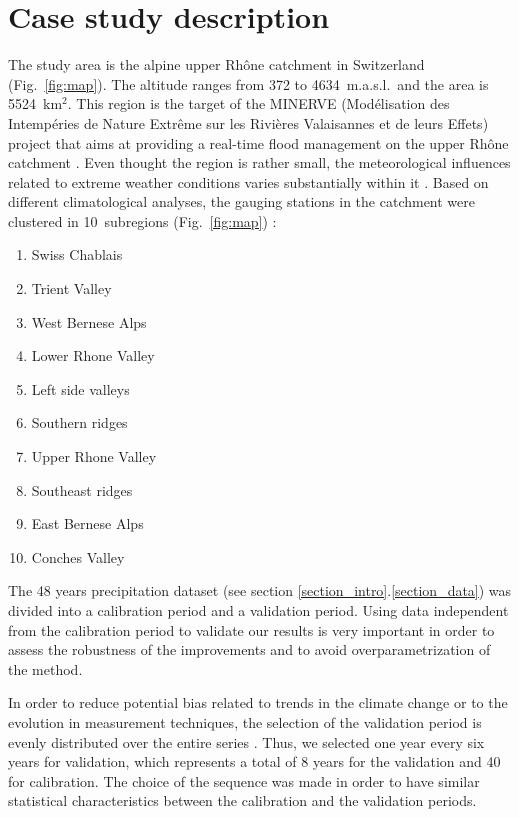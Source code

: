 \documentclass[twocol]{ametsoc}
\begin{document}
\section{Case study description}

The study area is the alpine upper Rh\^{o}ne catchment in Switzerland (Fig.\ \ref{fig:map}). The altitude ranges from 372 to 4634~m.a.s.l.\ and the area is 5524~km$^{2}$. This region is the target of the MINERVE (Mod\'{e}lisation des Intemp\'{e}ries de Nature Extr\^{e}me sur les Rivi\`{e}res Valaisannes et de leurs Effets) project that aims at providing a real-time flood management on the upper Rh\^{o}ne catchment \citep{GarciaHernandez2009b}. Even thought the region is rather small, the meteorological influences related to extreme weather conditions varies substantially within it \citep[see][]{Horton2012}. Based on different climatological analyses, the gauging stations in the catchment were clustered in 10~subregions (Fig.\ \ref{fig:map}) :

\begin{enumerate}
	\setlength\itemsep{-4px}
	\item Swiss Chablais
	\item Trient Valley
	\item West Bernese Alps
	\item Lower Rhone Valley
	\item Left side valleys
	\item Southern ridges
	\item Upper Rhone Valley
	\item Southeast ridges
	\item East Bernese Alps
	\item Conches Valley
\end{enumerate}

The 48 years precipitation dataset (see section \ref{section_intro}.\ref{section_data}) was divided into a calibration period and a validation period. Using data independent from the calibration period to validate our results is very important in order to assess the robustness of the improvements and to avoid overparametrization of the method.

In order to reduce potential bias related to trends in the climate change or to the evolution in measurement techniques, the selection of the validation period is evenly distributed over the entire series \citep{BenDaoud2010}. Thus, we selected one year every six years for validation, which represents a total of 8 years for the validation and 40 for calibration. The choice of the sequence was made in order to have similar statistical characteristics between the calibration and the validation periods.
\end{document}
